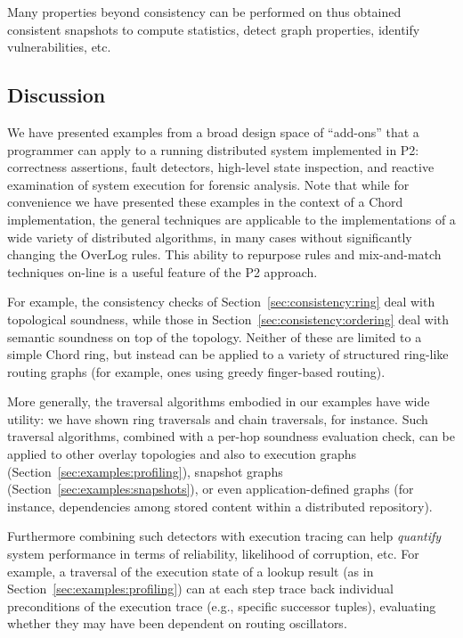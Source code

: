 \documentclass{sig-alt-full}
\def\Sys{P2\xspace}
\def\Lang{OverLog\xspace}
\begin{document}
Many properties beyond consistency can be
performed on thus obtained consistent snapshots to
compute statistics, detect graph properties, identify
vulnerabilities, etc.









\subsection{Discussion}

We have presented examples from a broad
design space of ``add-ons'' that a programmer can apply to a running
distributed system implemented in \Sys: correctness assertions,  fault
detectors, high-level state inspection, and reactive examination of
system execution for forensic analysis.  Note that while for
convenience we have presented these examples in the context of a Chord
implementation, the general techniques are applicable to the
implementations of a wide variety of distributed algorithms, in many 
cases without significantly changing the \Lang rules. 
This ability to repurpose rules and mix-and-match techniques on-line is
a useful feature of the \Sys approach.   

For example, the consistency checks of Section~\ref{sec:consistency:ring}
deal with topological soundness, while those in
Section~\ref{sec:consistency:ordering} deal with semantic soundness on top of 
the topology.  Neither of these are limited to a simple Chord ring, but
instead can be applied to a variety of structured ring-like routing
graphs (for example, ones using greedy finger-based routing). 

More generally, the traversal algorithms embodied in our examples have
wide utility: we have shown ring traversals and chain
traversals, for instance.  Such traversal algorithms, combined with a per-hop
soundness evaluation check, can be applied to other overlay
topologies and also to execution graphs
(Section~\ref{sec:examples:profiling}), snapshot graphs
(Section~\ref{sec:examples:snapshots}), or even application-defined graphs
(for instance, dependencies among stored content within a distributed
repository). 

Furthermore combining such detectors with execution tracing can help
\emph{quantify} system performance in terms of reliability, likelihood
of corruption, etc.   For example, a traversal of the execution state
of a lookup result (as in Section~\ref{sec:examples:profiling}) can at each
step trace back individual preconditions of the execution trace (e.g.,
specific successor tuples), evaluating whether they may have been
dependent on routing oscillators.  
\end{document}
